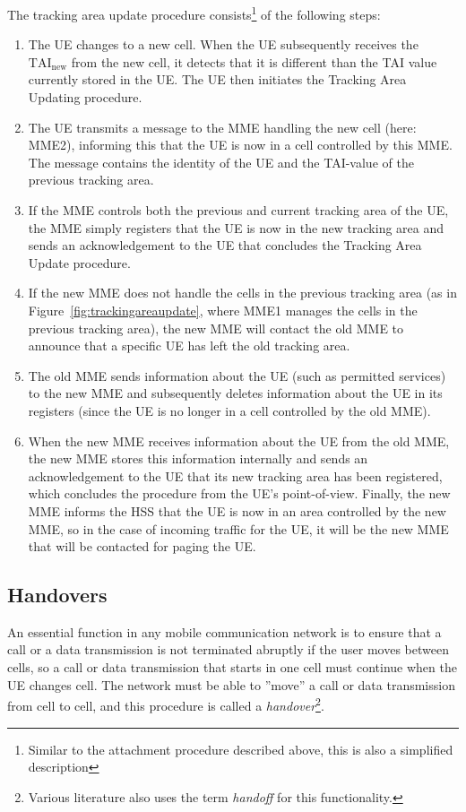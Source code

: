 The tracking area update procedure consists\footnote{Similar to the attachment procedure described above, this is also a simplified description} of the following steps:
\begin{enumerate}
	\item The UE changes to a new cell. When the UE subsequently receives the $\textrm{TAI}_{\textrm{new}}$ from the new cell, it detects that it is different than the TAI value currently stored in the UE. The UE then initiates the Tracking Area Updating procedure.
	\item The UE transmits a message to the MME handling the new cell (here: MME2), informing this that the UE is now in a cell controlled by this MME. The message contains the identity of the UE and the TAI-value of the previous tracking area.
	\item If the MME controls both the previous and current tracking area of the UE, the MME simply registers that the UE is now in the new tracking area and sends an acknowledgement to the UE that concludes the Tracking Area Update procedure.
	\item If the new MME does not handle the cells in the previous tracking area (as in Figure~\ref{fig:trackingareaupdate}, where MME1 manages the cells in the previous tracking area), the new MME will contact the old MME to announce that a specific UE has left the old tracking area.
	\item The old MME sends information about the UE (such as permitted services) to the new MME and subsequently deletes information about the UE in its registers (since the UE is no longer in a cell controlled by the old MME).
	\item When the new MME receives information about the UE from the old MME, the new MME stores this information internally and sends an acknowledgement to the UE that its new tracking area has been registered, which concludes the procedure from the UE's point-of-view. Finally, the new MME informs the HSS that the UE is now in an area controlled by the new MME, so in the case of incoming traffic for the UE, it will be the new MME that will be contacted for paging the UE.
\end{enumerate}

\subsection{Handovers}\label{sec:handover}
An essential function in any mobile communication network is to ensure that a call or a data transmission is not terminated abruptly if the user moves between cells, so a call or data transmission that starts in one cell must continue when the UE changes cell. The network must be able to ''move'' a call or data transmission from cell to cell, and this procedure is called a \emph{handover}\footnote{Various literature also uses the term \emph{handoff} for this functionality.}.

